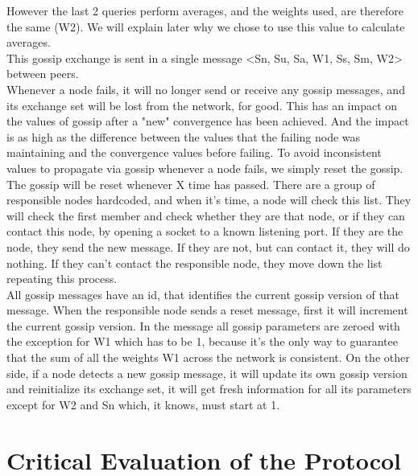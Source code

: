 \documentclass[times,9pt,article]{llncs}
\begin{document}
However the last 2 queries perform averages, and the weights used, are therefore the same (W2). We will explain later why we chose to use this value to calculate averages.\\
This gossip exchange is sent in a single message <Sn, Su, Sa, W1, Ss, Sm, W2> between peers.\\
Whenever a node fails, it will no longer send or receive any gossip messages, and its exchange set will be lost from the network, for good. This has an impact on the values of gossip after a "new" convergence has been achieved. And the impact is as high as the difference between the values that the failing node was maintaining and the convergence values before failing. To avoid inconsistent values to propagate via gossip whenever a node fails, we simply reset the gossip. The gossip will be reset whenever X time has passed. There are a group of responsible nodes hardcoded, and when it's time, a node will check this list. They will check the first member and check whether they are that node, or if they can contact this node, by opening a socket to a known listening port. If they are the node, they send the new message. If they are not, but can contact it, they will do nothing. If they can't contact the responsible node, they move down the list repeating this process.\\
All gossip messages have an id, that identifies the current gossip version of that message. When the responsible node sends a reset message, first it will increment the current gossip version. In the message all gossip parameters are zeroed with the exception for W1 which has to be 1, because it's the only way to guarantee that the sum of all the weights W1 across the network is consistent. On the other side, if a node detects a new gossip message, it will update its own gossip version and reinitialize its exchange set, it will get fresh information for all its parameters except for W2 and Sn which, it knows, must start at 1.

\section{Critical Evaluation of the Protocol}
\end{document}
